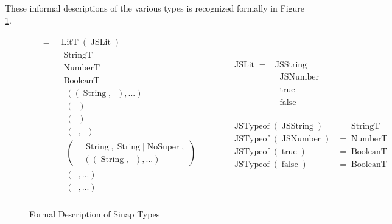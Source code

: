 \documentclass{article}
\DeclareMathOperator{\StringT}{StringT}
\DeclareMathOperator{\NumberT}{NumberT}
\DeclareMathOperator{\BooleanT}{BooleanT}
\DeclareMathOperator{\LitT}{LitT}
\DeclareMathOperator{\JSLit}{JSLit}
\DeclareMathOperator{\JSTypeof}{JSTypeof}
\DeclareMathOperator{\RecT}{RecT_\Gamma}
\DeclareMathOperator{\ObjT}{ObjT_\Gamma}
\DeclareMathOperator{\ListT}{ListT_\Gamma}
\DeclareMathOperator{\SetT}{SetT_\Gamma}
\DeclareMathOperator{\MapT}{MapT_\Gamma}
\DeclareMathOperator{\UnionT}{UnionT_\Gamma}
\DeclareMathOperator{\InterT}{InterT_\Gamma}
\DeclareMathOperator{\String}{String}
\DeclareMathOperator{\Type}{Type_\Gamma}
\DeclareMathOperator{\NoSuper}{NoSuper}
\begin{document}
These informal descriptions of the various types is recognized formally 
in Figure \ref{sinap-types-model}.

\begin{figure}
\begin{mdframed}
\begin{align*}
\begin{aligned}
\Type = &\LitT(\JSLit) \\
&|\StringT \\
&|\NumberT \\
&|\BooleanT \\
&|\RecT((\String, \Type), ...) \\
&|\ListT(\Type) \\
&|\SetT(\Type) \\
&|\MapT(\Type, \Type) \\
&|\ObjT\left(\begin{aligned}
    &\String, \String | \NoSuper, \\
&((\String, \Type), ...)
\end{aligned}\right) \\
&|\InterT(\ObjT, ...) \\
&|\UnionT(\Type, ...)\\
\end{aligned}
\quad\quad\quad\begin{aligned}        
\begin{aligned}
\JSLit = &\operatorname{JSString} \\
&| \operatorname{JSNumber} \\
&| \operatorname{true} \\
&| \operatorname{false} \\
\end{aligned}\\\\
\begin{aligned}
\JSTypeof(\operatorname{JSString}) &= \StringT \\
\JSTypeof(\operatorname{JSNumber}) &= \NumberT \\
\JSTypeof(\operatorname{true}) &= \BooleanT \\
\JSTypeof(\operatorname{false}) &= \BooleanT \\
\end{aligned}  
\end{aligned}  
\end{align*}
\end{mdframed}
\caption{Formal Description of Sinap Types}
\label{sinap-types-model}
\end{figure}
\end{document}
